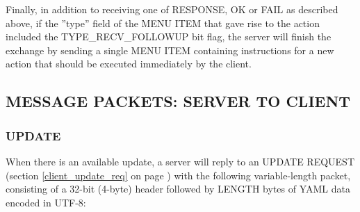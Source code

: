 \documentclass[a4paper,11pt]{article}
\begin{document}
\begin{minipage}{\dimexpr\textwidth-1.4cm}
\vspace{0.3cm}
Finally, in addition to receiving one of RESPONSE, OK or FAIL as
described above, if the ''type'' field of the MENU ITEM that gave rise to the action
included the TYPE\_RECV\_FOLLOWUP bit flag, the server will finish the
exchange by sending a single MENU ITEM containing instructions for a
new action that should be executed immediately by the client.

\end{minipage}

\subsection{MESSAGE PACKETS: SERVER TO CLIENT}
\subsubsection{UPDATE}
\label{server_update}
\hfill\begin{minipage}{\dimexpr\textwidth-1.4cm}
When there is an available update, a server will reply to an
UPDATE REQUEST (section \ref{client_update_req} on page \pageref{client_update_req})
with the following variable-length packet, consisting of a
32-bit (4-byte) header followed by LENGTH bytes of YAML data
encoded in UTF-8:

\vspace{0.2cm}


\bigskip

\end{minipage}
\end{document}
